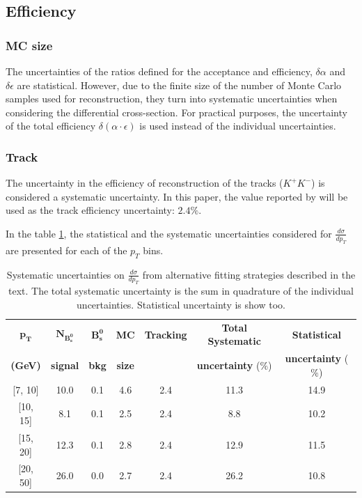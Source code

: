 \cleardoublepage
\subsection{Efficiency}

\subsubsection{MC size}
The uncertainties of the ratios defined for the acceptance and efficiency, $\delta \alpha$ and $\delta \epsilon$ are statistical. However, due to the finite size of the number of Monte Carlo samples used for reconstruction, they turn into systematic uncertainties when considering the differential cross-section. For practical purposes, the uncertainty of the total efficiency $\delta(\alpha \cdot \epsilon)$ is used instead of the individual uncertainties.


\subsubsection{Track}

The uncertainty in the efficiency of reconstruction of the tracks ($K^{+}K^{-}$) is considered a systematic uncertainty. In this paper, the value reported by \cite{cms2018tracking} will be used as the track efficiency uncertainty: $2.4\%$.

In the table \ref{table:Systematics}, the statistical and the systematic uncertainties considered for $\frac{d \sigma}{dp_T}$ are presented for each of the $p_T$ bins.
\begin{table}[htbp] \begin{center}\begin{tabular}{|c|c|c|c|c|c|c|}\hline$\mathbf{p_T}$    &  $\mathbf{N_{B_s^{0}}} $    &  $\mathbf{B_s^{0}} $  & \textbf{MC}   & \textbf{Tracking}  & \textbf{Total Systematic}  & \textbf{Statistical} \\\textbf{(GeV)}   & \textbf{signal}   & \textbf{bkg}    & \textbf{size} &           & \textbf{uncertainty} ($\mathbf{\%}$) & \textbf{uncertainty} ($\mathbf{\%}$) \\\hline{[}7, 10{]}  &  10.0  &  0.1 &  4.6  &  2.4 &  11.3 &  14.9 \\{[}10, 15{]}  &  8.1  &  0.1 &  2.5  &  2.4 &  8.8 &  10.2 \\{[}15, 20{]}  &  12.3  &  0.1 &  2.8  &  2.4 &  12.9 &  11.5 \\{[}20, 50{]}  &  26.0  &  0.0 &  2.7  &  2.4 &  26.2 &  10.8 \\\hline\end{tabular}\caption{Systematic uncertainties on  ${\frac{d \sigma}{dp_T}}$ from alternative fitting strategies described in the text. The total systematic uncertainty is the sum in quadrature of the individual uncertainties. Statistical uncertainty is show too.}\label{table:Systematics}\end{center}\end{table}